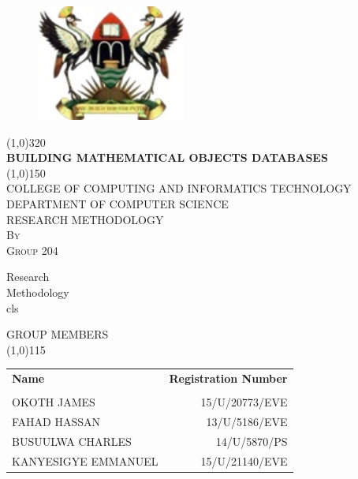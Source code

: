 \documentclass{article}
\begin{document}
\begin{titlepage}
	\begin{figure}
		\centering
		\includegraphics[height=1.5in]{muk.jpg}
	\end{figure}
	\begin{center}
		\line(1,0){320}\\
		[0.25in]
		\huge{\bfseries BUILDING MATHEMATICAL OBJECTS DATABASES}\\
		[2mm]
		\line(1,0){150}\\
		[1.2cm]
		\textsc{\large COLLEGE OF COMPUTING AND INFORMATICS TECHNOLOGY}\\
		[0.5cm]
\textsc{\large DEPARTMENT OF COMPUTER SCIENCE}\\
		[0.5cm]	
		\textsc{\large RESEARCH METHODOLOGY}\\
		[0.5cm]
		\textsc{\large By}\\
		[0.5cm]
		\textsc{\large Group 204}\\
		[4cm]
	\end{center}
	\begin{flushright}
	    Research\\
		Methodology\\
		cls\\
	\end{flushright}
\end{titlepage}
\thispagestyle{empty}
\centering
	\textsc{\large GROUP MEMBERS} \\
	\line(1,0){115}\\
	[0.25in]
\begin{table}[H]
	\centering
	\label{Tab:GroupMembers}
	\begin{tabular}{lr}
		\bfseries{Name} & \bfseries{Registration Number} \\ \\ 
		OKOTH JAMES         & 15/U/20773/EVE \\
		FAHAD HASSAN        & 13/U/5186/EVE \\
		BUSUULWA CHARLES    & 14/U/5870/PS \\   
		KANYESIGYE EMMANUEL & 15/U/21140/EVE \\
	\end{tabular}
\end{table}
\newpage
\thispagestyle{empty}
\cleardoublepage
\setcounter{page}{1}
\end{document}
